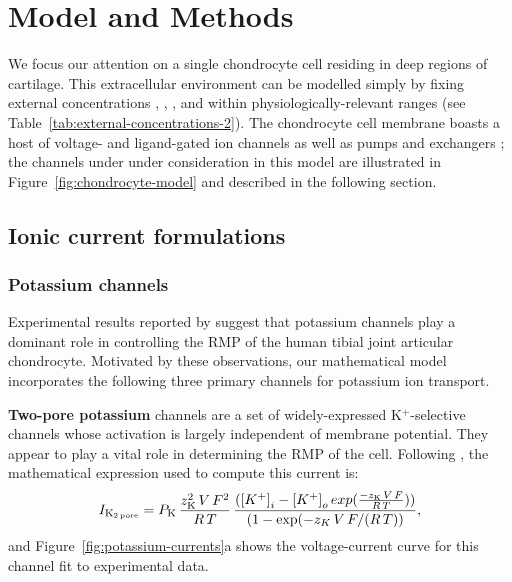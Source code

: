 \section*{Model and Methods}
\label{sec:model-and-methods}

We focus our attention on a single chondrocyte cell residing in deep
regions of cartilage. This extracellular environment can be modelled
simply by fixing external concentrations \Nao, \Ko, \Cao, \Ho{} and
\Clo{} within physiologically-relevant ranges (see
Table~\ref{tab:external-concentrations-2}). The chondrocyte cell
membrane boasts a host of voltage- and ligand-gated ion channels as
well as pumps and exchangers \citep{UNKNOWN}; the channels under under
consideration in this model are illustrated in
Figure~\ref{fig:chondrocyte-model} and described in the following
section.

\subsection*{Ionic current formulations}
\label{sec:formulation-ionic-current}


\subsubsection*{Potassium channels}
\label{sec:potassium-channels}

Experimental results reported by \citet{Clarketal2011} suggest that
potassium channels play a dominant role in controlling the RMP of the
human tibial joint articular chondrocyte. Motivated by these
observations, our mathematical model incorporates the following three
primary channels for potassium ion transport.

{\bf Two-pore potassium} channels are a set of widely-expressed
K$^{+}$-selective channels whose activation is largely independent of
membrane potential. They appear to play a vital role in determining
the RMP of the cell. Following \citet{UNKNOWN}, the mathematical
expression used to compute this current is:
\begin{equation}
 I_{\rm K_{2\, pore}} = P_{\rm K}\, \frac{z_{\rm K}^2\, V\, F^{2}}{R\,
   T}\, \frac{({\left[K^{+}\right]_{i}} - {\left[K^{+}\right]_{o}}\,
 exp(\frac{-z_{\rm K}\, V\, F}{R\, T}))}{(1 - \exp(-z_K\, V\, F/(R\,
 T))},
\end{equation}
and Figure~\ref{fig:potassium-currents}a shows the voltage-current
curve for this channel fit to experimental data.

